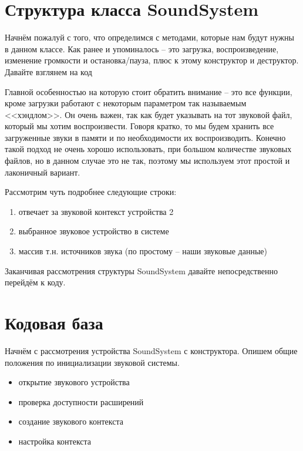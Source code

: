 \section{Структура класса SoundSystem}
Начнём пожалуй с того, что определимся с методами, которые нам будут нужны в данном классе.
Как ранее и упоминалось -- это загрузка, воспроизведение, изменение громкости и остановка/пауза, 
плюс к этому конструктор и деструктор. Давайте взглянем на код


\pagebreak

Главной особенностью на которую стоит обратить внимание -- это все функции, кроме загрузки работают 
с некоторым параметром так называемым <<хэндлом>>. Он очень важен, так как будет указывать на тот 
звуковой файл, который мы хотим воспроизвести. Говоря кратко, то мы будем хранить все загруженные 
звуки в памяти и по необходимости их воспроизводить. Конечно такой подход не очень хорошо использовать, 
при большом количестве звуковых файлов, но в данном случае это не так, поэтому мы используем этот 
простой и лаконичный вариант.

Рассмотрим чуть подробнее следующие строки:

\begin{enumerate}\itemsep-5pt
    \item отвечает за звуковой контекст устройства 2
    \item выбранное звуковое устройство в системе
    \item массив т.н. источников звука (по простому -- наши звуковые данные)
\end{enumerate}

Заканчивая рассмотрения структуры SoundSystem давайте непосредственно перейдём к коду.

\section{Кодовая база}
Начнём с рассмотрения устройства SoundSystem с конструктора. Опишем общие положения по 
инициализации звуковой системы.
\begin{itemize}\itemsep-5pt
    \item открытие звукового устройства
    \item проверка доступности расширений
    \item создание звукового контекста
    \item настройка контекста
\end{itemize}


